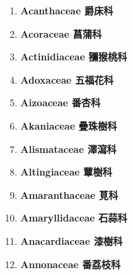     \begin{enumerate}
      \item[] \begin{small}\textbf{Acanthaceae 爵床科} \end{small}
        
      \item[] \begin{small}\textbf{Acoraceae 菖蒲科} \end{small}
        
      \item[] \begin{small}\textbf{Actinidiaceae 獼猴桃科} \end{small}
        
      \item[] \begin{small}\textbf{Adoxaceae 五福花科} \end{small}
        
      \item[] \begin{small}\textbf{Aizoaceae 番杏科} \end{small}
        
      \item[] \begin{small}\textbf{Akaniaceae 疊珠樹科} \end{small}
        
      \item[] \begin{small}\textbf{Alismataceae 澤瀉科} \end{small}
        
      \item[] \begin{small}\textbf{Altingiaceae 蕈樹科} \end{small}
        
      \item[] \begin{small}\textbf{Amaranthaceae 莧科} \end{small}
        
      \item[] \begin{small}\textbf{Amaryllidaceae 石蒜科} \end{small}
        
      \item[] \begin{small}\textbf{Anacardiaceae 漆樹科} \end{small}
        
      \item[] \begin{small}\textbf{Annonaceae 番荔枝科} \end{small}

\end{enumerate}
